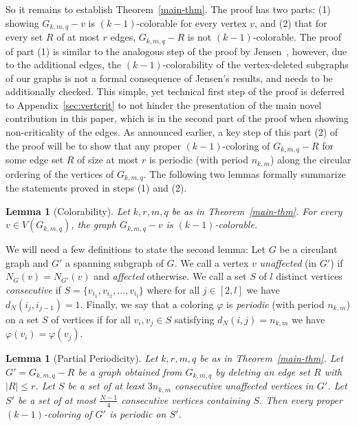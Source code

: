 \documentclass[a4paper,10pt,hidelinks]{amsart}
\newtheorem{lemma}[theorem]{Lemma}
\theoremstyle{definition}
\begin{document}
    So it remains to establish Theorem~\ref{main-thm}. The proof has two parts: (1) showing $G_{k,m,q} - v$ is $(k - 1)$-colorable for every vertex $v$, and (2) that for every set $R$ of at most $r$ edges, $G_{k,m,q}- R$ is not $(k-1)$-colorable. The proof of part (1) is similar to the analogous step of the proof by Jensen~\cite{jensen}, however, due to the additional edges, the $(k-1)$-colorability of the vertex-deleted subgraphs of our graphs is not a formal consequence of Jensen's results, and needs to be additionally checked. This simple, yet technical first step of the proof is deferred to Appendix~\ref{sec:vertcrit} to not hinder the presentation of the main novel contribution in this paper, which is in the second part of the proof when showing non-criticality of the edges. As announced earlier, a key step of this part (2) of the proof will be to show that any proper $(k-1)$-coloring of $G_{k,m,q}-R$ for some edge set $R$ of size at most $r$ is periodic (with period $n_{k,m}$) along the circular ordering of the vertices of $G_{k,m,q}$. The following two lemmas formally summarize the statements proved in steps (1) and (2).

    \begin{lemma}[Colorability]\label{colorability-lemma}
        Let $k, r, m, q$ be as in Theorem~\ref{main-thm}. For every $v \in V(G_{k, m, q})$, the graph $G_{k, m, q} - v$ is $(k-1)$-colorable.
    \end{lemma}

    We will need a few definitions to state the second lemma: Let $G$ be a circulant graph and $G'$ a spanning subgraph of $G$. We call a vertex $v$ \emph{unaffected} (in $G'$) if $N_G(v) = N_{G'}(v)$ and \emph{affected} otherwise. We call a set $S$ of $l$ distinct vertices \emph{consecutive} if $S = \{v_{i_1}, v_{i_2}, \dots, v_{i_l}\}$ where for all $j \in [2, l]$ we have $d_N(i_j, i_{j - 1}) = 1$. Finally, we say that a coloring $\varphi$ is \emph{periodic} (with period $n_{k, m}$) on a set $S$ of vertices if for all $v_i, v_j \in S$ satisfying $d_N(i, j) = n_{k, m}$ we have $\varphi(v_i) = \varphi(v_j)$.

    \begin{lemma}[Partial Periodicity]\label{partial-periodicity-lemma}
        Let $k, r, m, q$ be as in Theorem~\ref{main-thm}. Let $G'=G_{k, m, q}-R$ be a graph obtained from $G_{k, m, q}$ by deleting an edge set $R$ with $|R|\le r$. Let $S$ be a set of at least $3n_{k, m}$ consecutive unaffected vertices in $G'$. Let $S'$ be a set of at most $\frac{N-1}{4}$ consecutive vertices containing $S$. Then every proper $(k - 1)$-coloring of $G'$ is periodic on $S'$.
    \end{lemma}
\end{document}
